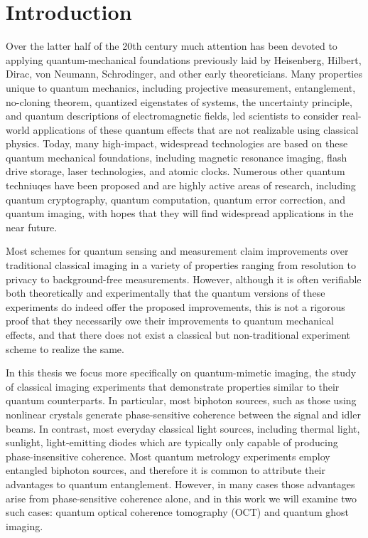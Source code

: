 \chapter{Introduction}
Over the latter half of the 20th century much attention has been devoted to applying quantum-mechanical foundations previously laid by Heisenberg, Hilbert, Dirac, von Neumann, Schrodinger, and other early theoreticians. Many properties unique to quantum mechanics, including projective measurement, entanglement, no-cloning theorem, quantized eigenstates of systems, the uncertainty principle, and quantum descriptions of electromagnetic fields, led scientists to consider real-world applications of these quantum effects that are not realizable using classical physics. Today, many high-impact, widespread technologies are based on these quantum mechanical foundations, including magnetic resonance imaging, flash drive storage, laser technologies, and atomic clocks. Numerous other quantum techniuqes have been proposed and are highly active areas of research, including quantum cryptography, quantum computation, quantum error correction, and quantum imaging, with hopes that they will find widespread applications in the near future.

Most schemes for quantum sensing and measurement claim improvements over traditional classical imaging in a variety of properties ranging from resolution to privacy to background-free measurements. However, although it is often verifiable both theoretically and experimentally that the quantum versions of these experiments do indeed offer the proposed improvements, this is not a rigorous proof that they necessarily owe their improvements to quantum mechanical effects, and that there does not exist a classical but non-traditional experiment scheme to realize the same.

In this thesis we focus more specifically on quantum-mimetic imaging, the study of classical imaging experiments that demonstrate properties similar to their quantum counterparts. In particular, most biphoton sources, such as those using nonlinear crystals generate phase-sensitive coherence between the signal and idler beams. In contrast, most everyday classical light sources, including thermal light, sunlight, light-emitting diodes which are typically only capable of producing phase-insensitive coherence. Most quantum metrology experiments employ entangled biphoton sources, and therefore it is common to attribute their advantages to quantum entanglement. However, in many cases those advantages arise from phase-sensitive coherence alone, and in this work we will examine two such cases: quantum optical coherence tomography (OCT) and quantum ghost imaging.

